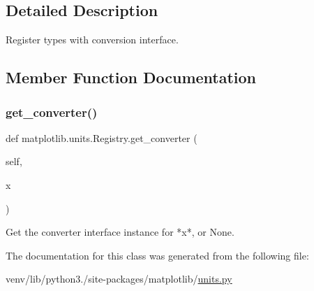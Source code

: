 \subsection{Detailed Description}
\begin{DoxyVerb}Register types with conversion interface.\end{DoxyVerb}
 

\subsection{Member Function Documentation}
\mbox{\label{classmatplotlib_1_1units_1_1Registry_a4423acdb3e5a33b7a7ef21e21ef3c25c}} 
\subsubsection{\texorpdfstring{get\+\_\+converter()}{get\_converter()}}
{\footnotesize\ttfamily def matplotlib.\+units.\+Registry.\+get\+\_\+converter (\begin{DoxyParamCaption}\item[{}]{self,  }\item[{}]{x }\end{DoxyParamCaption})}

\begin{DoxyVerb}Get the converter interface instance for *x*, or None.\end{DoxyVerb}
 

The documentation for this class was generated from the following file\+:\begin{DoxyCompactItemize}
\item 
venv/lib/python3./site-\/packages/matplotlib/\hyperlink{units_8py}{units.\+py}\end{DoxyCompactItemize}
